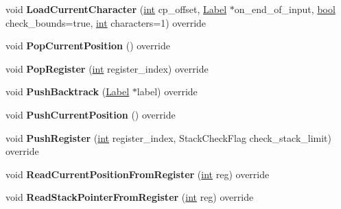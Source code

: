 \begin{DoxyCompactItemize}
void {\bfseries Load\+Current\+Character} (\mbox{\hyperlink{classint}{int}} cp\+\_\+offset, \mbox{\hyperlink{classv8_1_1internal_1_1Label}{Label}} $\ast$on\+\_\+end\+\_\+of\+\_\+input, \mbox{\hyperlink{classbool}{bool}} check\+\_\+bounds=true, \mbox{\hyperlink{classint}{int}} characters=1) override
\item 
\mbox{\label{classv8_1_1internal_1_1RegExpMacroAssemblerTracer_ab0668d43a070038847c4aa5b6f5b6695}} 
void {\bfseries Pop\+Current\+Position} () override
\item 
\mbox{\label{classv8_1_1internal_1_1RegExpMacroAssemblerTracer_a686d7fa60fc26a66968634103ef1b756}} 
void {\bfseries Pop\+Register} (\mbox{\hyperlink{classint}{int}} register\+\_\+index) override
\item 
\mbox{\label{classv8_1_1internal_1_1RegExpMacroAssemblerTracer_adc4a32ff8deb6ea76ddba7a34bd0a65d}} 
void {\bfseries Push\+Backtrack} (\mbox{\hyperlink{classv8_1_1internal_1_1Label}{Label}} $\ast$label) override
\item 
\mbox{\label{classv8_1_1internal_1_1RegExpMacroAssemblerTracer_a3c9b38a9615fd8dfcabd9813317d91fa}} 
void {\bfseries Push\+Current\+Position} () override
\item 
\mbox{\label{classv8_1_1internal_1_1RegExpMacroAssemblerTracer_aa2d18b69aaacef7ed1b781fafba6d8f5}} 
void {\bfseries Push\+Register} (\mbox{\hyperlink{classint}{int}} register\+\_\+index, Stack\+Check\+Flag check\+\_\+stack\+\_\+limit) override
\item 
\mbox{\label{classv8_1_1internal_1_1RegExpMacroAssemblerTracer_ac9a062f6a379913024669b89150019db}} 
void {\bfseries Read\+Current\+Position\+From\+Register} (\mbox{\hyperlink{classint}{int}} reg) override
\item 
\mbox{\label{classv8_1_1internal_1_1RegExpMacroAssemblerTracer_a0308ce6797e079508d173db246a46a26}} 
void {\bfseries Read\+Stack\+Pointer\+From\+Register} (\mbox{\hyperlink{classint}{int}} reg) override

\end{DoxyCompactItemize}

